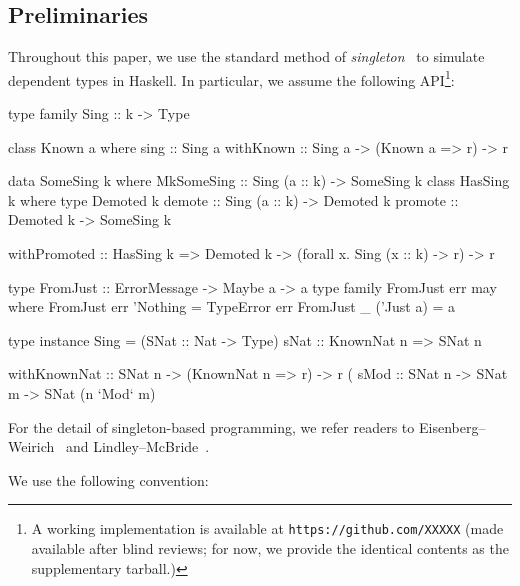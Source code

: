 \documentclass[demotion-paper.tex]{subfiles}
\begin{document}
\subsection{Preliminaries}
Throughout this paper, we use the standard method of \emph{singleton}~\cite{Eisenberg:2012} to simulate dependent types in Haskell.
In particular, we assume the following API\footnote{A working implementation is available at \texttt{https://github.com/XXXXX} (made available after blind reviews; for now, we provide the identical contents as the supplementary tarball.)}:

\begin{code}
type family Sing :: k -> Type

class Known a where
  sing :: Sing a
withKnown :: Sing a -> (Known a => r) -> r

data SomeSing k where
  MkSomeSing :: Sing (a :: k) -> SomeSing k
class HasSing k where
  type Demoted k 
  demote :: Sing (a :: k) -> Demoted k
  promote :: Demoted k -> SomeSing k

withPromoted :: HasSing k
  => Demoted k
  -> (forall x. Sing (x :: k) -> r) -> r

type FromJust :: ErrorMessage -> Maybe a -> a
type family FromJust err may where 
  FromJust err 'Nothing = TypeError err
  FromJust _ ('Just a)  = a

type instance Sing = (SNat :: Nat -> Type)
sNat :: KnownNat n => SNat n

withKnownNat :: SNat n -> (KnownNat n => r) -> r
(%
sMod :: SNat n -> SNat m -> SNat (n `Mod` m)
\end{code}

For the detail of singleton-based programming, we refer readers to Eisenberg--Weirich~\cite{Eisenberg:2012} and Lindley--McBride~\cite{10.1145/2503778.2503786}.

We use the following convention:
\end{document}
